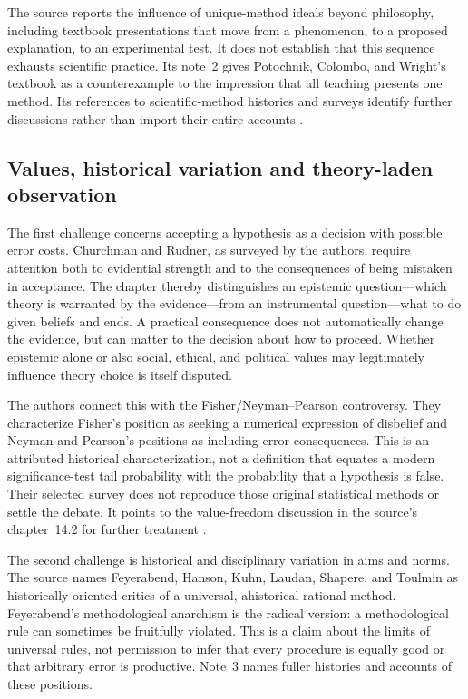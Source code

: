 The source reports the influence of unique-method ideals beyond
philosophy, including textbook presentations that move from a
phenomenon, to a proposed explanation, to an experimental test. It
does not establish that this sequence exhausts scientific practice.
Its note~2 gives Potochnik, Colombo, and Wright's textbook as a
counterexample to the impression that all teaching presents one
method. Its references to scientific-method histories and surveys
identify further discussions rather than import their entire accounts
\parencite[p.~748 and p.~753, nn.~1--2]{AndersenAndersen2021Scientific}.

\subsection{Values, historical variation and theory-laden observation}

The first challenge concerns accepting a hypothesis as a decision
with possible error costs. Churchman and Rudner, as surveyed by the
authors, require attention both to evidential strength and to the
consequences of being mistaken in acceptance. The chapter thereby
distinguishes an epistemic question---which theory is warranted by
the evidence---from an instrumental question---what to do given
beliefs and ends. A practical consequence does not automatically change
the evidence, but can matter to the decision about how to proceed.
Whether epistemic alone or also social, ethical, and political values
may legitimately influence theory choice is itself disputed.

The authors connect this with the Fisher/Neyman--Pearson controversy.
They characterize Fisher's position as seeking a numerical expression
of disbelief and Neyman and Pearson's positions as including error
consequences. This is an attributed historical characterization, not
a definition that equates a modern significance-test tail probability
with the probability that a hypothesis is false. Their selected survey
does not reproduce those original statistical methods or settle the
debate. It points to the value-freedom discussion in the source's
chapter~14.2 for further treatment
\parencite[p.~748]{AndersenAndersen2021Scientific}.

The second challenge is historical and disciplinary variation in aims
and norms. The source names Feyerabend, Hanson, Kuhn, Laudan, Shapere,
and Toulmin as historically oriented critics of a universal,
ahistorical rational method. Feyerabend's methodological anarchism is
the radical version: a methodological rule can sometimes be fruitfully
violated. This is a claim about the limits of universal rules, not
permission to infer that every procedure is equally good or that
arbitrary error is productive. Note~3 names fuller histories and
accounts of these positions.

